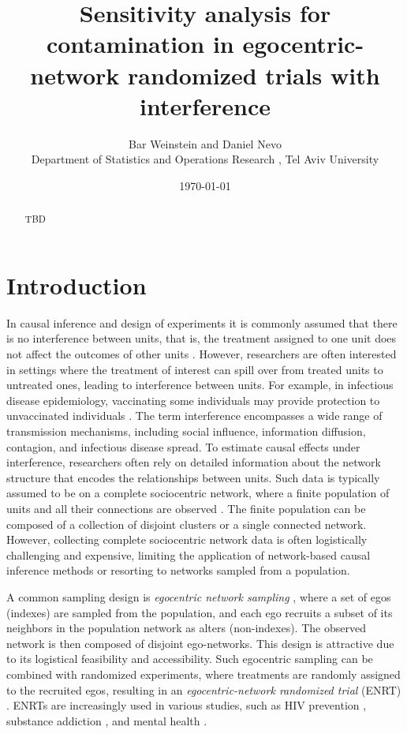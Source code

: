 \documentclass[11pt]{article}
\title{\textbf{Sensitivity analysis for contamination in egocentric-network randomized trials with interference}}
\author{Bar Weinstein and Daniel Nevo  
\vspace{.1cm} \\
Department  of Statistics and Operations Research , Tel Aviv University
}
\date{\today}
\theoremstyle{definition}
\begin{document}
\maketitle

\begin{abstract}
    TBD
\end{abstract}

\section{Introduction}
\label{sec:intro}
In causal inference and design of experiments it is commonly assumed that there is no interference between units,
 that is, the treatment assigned to one unit does not affect the outcomes of other units \citep{Cox1958,Hernan2020}.
However, researchers are often interested in settings where 
the treatment of interest can spill over from treated units to untreated ones,
leading to interference between units.
For example, in infectious disease epidemiology,
 vaccinating some individuals may provide protection to unvaccinated individuals \citep{Halloran1991}.
 The term interference encompasses a wide range of transmission mechanisms,
 including social influence, information diffusion, contagion, and infectious disease spread.
 To estimate causal effects under interference, 
researchers often rely on detailed information about the network structure
that encodes the relationships between units.
Such data is typically assumed to be on a complete sociocentric network, 
where a finite population of units and all their 
connections are observed \citep{Hudgens2008, aronow_estimating_2017, Forastiere2020,Tchetgen2020,Ogburn2022}.
The finite population can be composed of a collection of disjoint clusters or a single connected network.
However, collecting complete sociocentric network data is often logistically challenging and expensive,
 limiting the application of network-based causal inference methods or
  resorting to networks sampled from a population. 

A common sampling design is \emph{egocentric network sampling} \citep{marsden2002egocentric,Perry2018},
where a set of egos (indexes) are sampled from the population,
    and each ego recruits a subset of its neighbors in the population network as alters (non-indexes).
The observed network is then composed of disjoint ego-networks.
This design is attractive due to its logistical feasibility and accessibility.
Such egocentric sampling can be combined with randomized experiments,
where treatments are randomly assigned to the recruited egos, 
resulting in an \emph{egocentric-network randomized trial} (ENRT) \citep{Buchanan2018,Buchanan_2024,Chao2023,Fang2023}.
ENRTs are increasingly used in various studies, 
such as HIV prevention \citep{Latkin2009, Latkin2013, Booth2016, Miller2018}, 
substance addiction \citep{Sherman2009}, 
and mental health \citep{Asmus2017, Desrosiers2020}.
\end{document}
